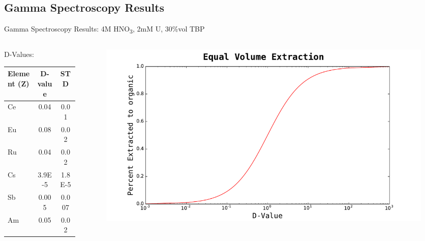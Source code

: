 \documentclass{beamer}
\newcommand{\tsbs}{\textsubscript}
\begin{document}
\subsection{Gamma Spectroscopy Results}
\begin{frame}{\small Gamma Spectroscopy Results: 4M HNO\tsbs{3}, 2mM U, 30\%vol TBP}

  \begin{columns}
    \begin{column}{0.4\textwidth}
  \vspace{-0.6cm}
  \begin{block}{D-Values:}
    \begin{center}
      \vskip -0.2cm
  {\fontsize{7}{11.2}\selectfont
  \begin{tabular}{l  c  c}\toprule
   Element (Z)  & D-value & STD\\ \midrule 
   Ce & 0.04 & 0.01  \\
   Eu & 0.08  & 0.02   \\
   Ru & 0.04  & 0.02  \\
   Cs & 3.9E-5 & 1.8E-5  \\
   Sb & 0.005   & 0.007   \\
   Am & 0.05   & 0.02  \\ \bottomrule
  \end{tabular}
  }
  \end{center}
  \end{block}
    \end{column}
    \begin{column}{0.7\textwidth}
      \begin{figure}[H]
        \vspace*{-1cm}
        \begin{center}
	  \includegraphics[scale = 0.3]{figures/D_Value_vs_Percent_Extraction_log}
	\end{center}
      \end{figure}
    \end{column}
  \end{columns}
\end{frame}
\end{document}
